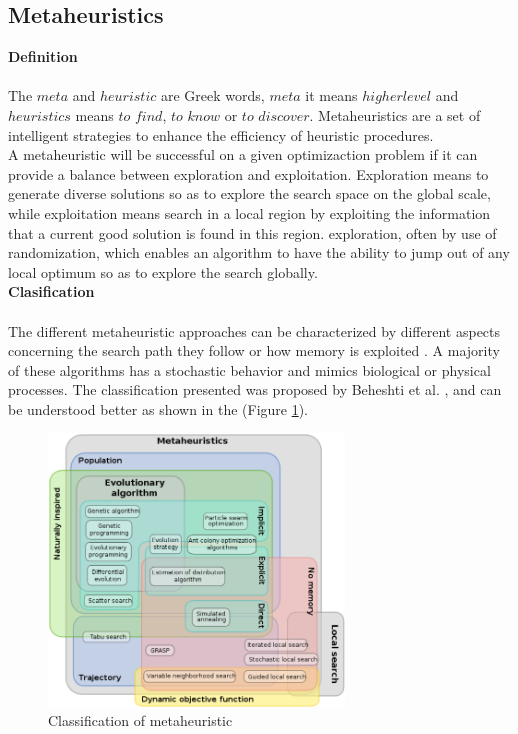 \subsection{Metaheuristics}
\textbf{Definition}
~\\
~\\
The $meta$ and $heuristic$ are Greek words, $meta$ it means $higher level$ and $heuristics$ means $to$ $find$, $to$ $know$ or $to$ $discover$. Metaheuristics are a set of intelligent strategies to enhance the efficiency of heuristic procedures.\\
A metaheuristic will be successful on a given optimizaction problem if it can provide a balance between exploration and exploitation. Exploration means to generate diverse solutions so as to explore the search space on the global scale, while exploitation means search in a local region by exploiting the information that a current good solution is found in this region.
exploration, often by use of randomization, which enables an algorithm to have the ability to jump out of any local optimum so as to explore the search globally.\\

\textbf{Clasification}
~\\
~\\
The different metaheuristic approaches can be characterized by different aspects concerning the search path they follow or how memory is exploited \cite{citeulike:1859945}. A majority of these algorithms has a stochastic behavior and mimics biological or  physical processes. The classification presented was proposed by Beheshti et al. \cite{Beheshti:2014:CCA:2563733.2564085}, and can be understood better as shown in the (Figure \ref{fig:classification-of-mh}).

\squeezeup
\begin{figure}[ht] %
	\centering
  \includegraphics[width=0.70\textwidth]{MarcoTeorico/imagenes/classification_mh.png}
	\caption{Classification of metaheuristic}\label{fig:classification-of-mh}
\end{figure}
\squeezeup


